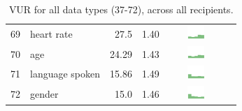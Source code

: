\begin{table}[t]
\begin{center}
\begin{tabular}{| r | l | r | r | r | r |}
69 & heart rate & 27.5 & 1.40 & \includegraphics[width = 2cm, height = 0.5cm]{tex-inputs/table-images/learnedyourheartratecombined} \\ 
70 & age & 24.29 & 1.43 &  \includegraphics[width = 2cm, height = 0.5cm]{tex-inputs/table-images/learnedyouragecombined} \\ 
71 & language spoken & 15.86 & 1.49 & \includegraphics[width = 2cm, height = 0.5cm]{tex-inputs/table-images/learnedthelanguageyouwerespeakingcombined} \\ 
72 & gender & 15.0 & 1.46 &  \includegraphics[width = 2cm, height = 0.5cm]{tex-inputs/table-images/learnedyourgendercombined} \\ 
\hline
\end{tabular}
\caption{VUR for all data types (37-72), across all recipients.}
\label{full-vur-table}
\end{center}
\end{table}
